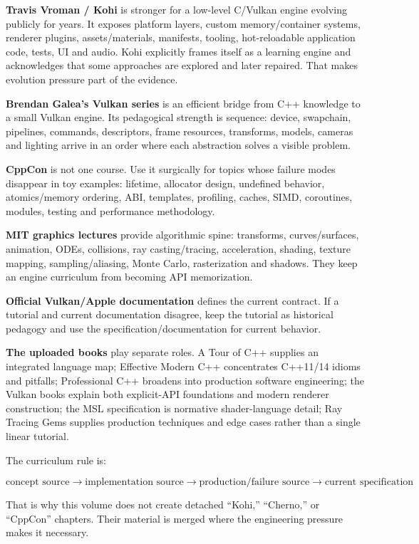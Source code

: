 \textbf{Travis Vroman / Kohi} is stronger for a low-level C/Vulkan engine evolving publicly for years. It exposes platform layers, custom memory/container systems, renderer plugins, assets/materials, manifests, tooling, hot-reloadable application code, tests, UI and audio. Kohi explicitly frames itself as a learning engine and acknowledges that some approaches are explored and later repaired. That makes evolution pressure part of the evidence.

\textbf{Brendan Galea's Vulkan series} is an efficient bridge from C++ knowledge to a small Vulkan engine. Its pedagogical strength is sequence: device, swapchain, pipelines, commands, descriptors, frame resources, transforms, models, cameras and lighting arrive in an order where each abstraction solves a visible problem.

\textbf{CppCon} is not one course. Use it surgically for topics whose failure modes disappear in toy examples: lifetime, allocator design, undefined behavior, atomics/memory ordering, ABI, templates, profiling, caches, SIMD, coroutines, modules, testing and performance methodology.

\textbf{MIT graphics lectures} provide algorithmic spine: transforms, curves/surfaces, animation, ODEs, collisions, ray casting/tracing, acceleration, shading, texture mapping, sampling/aliasing, Monte Carlo, rasterization and shadows. They keep an engine curriculum from becoming API memorization.

\textbf{Official Vulkan/Apple documentation} defines the current contract. If a tutorial and current documentation disagree, keep the tutorial as historical pedagogy and use the specification/documentation for current behavior.

\textbf{The uploaded books} play separate roles. A Tour of C++ supplies an integrated language map; Effective Modern C++ concentrates C++11/14 idioms and pitfalls; Professional C++ broadens into production software engineering; the Vulkan books explain both explicit-API foundations and modern renderer construction; the MSL specification is normative shader-language detail; Ray Tracing Gems supplies production techniques and edge cases rather than a single linear tutorial.

The curriculum rule is:

\[
\boxed{
\text{concept source}
\rightarrow
\text{implementation source}
\rightarrow
\text{production/failure source}
\rightarrow
\text{current specification}
}
\]

That is why this volume does not create detached ``Kohi,'' ``Cherno,'' or ``CppCon'' chapters. Their material is merged where the engineering pressure makes it necessary.

